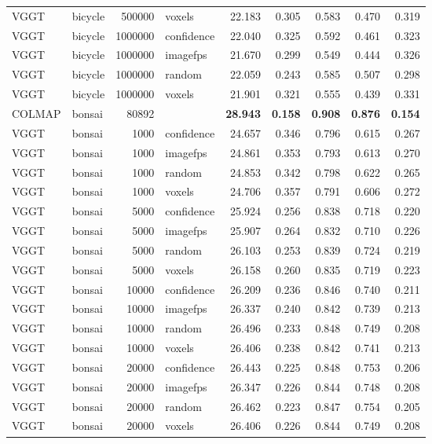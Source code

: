 \begin{table}[H]
\begin{tabular}{llrlrrrrr}
VGGT & bicycle & 500000 & voxels & 22.183 & 0.305 & 0.583 & 0.470 & 0.319 \\
VGGT & bicycle & 1000000 & confidence & 22.040 & 0.325 & 0.592 & 0.461 & 0.323 \\
VGGT & bicycle & 1000000 & imagefps & 21.670 & 0.299 & 0.549 & 0.444 & 0.326 \\
VGGT & bicycle & 1000000 & random & 22.059 & 0.243 & 0.585 & 0.507 & 0.298 \\
VGGT & bicycle & 1000000 & voxels & 21.901 & 0.321 & 0.555 & 0.439 & 0.331 \\
\midrule
COLMAP & bonsai & 80892 &  & \textbf{28.943} & \textbf{0.158} & \textbf{0.908} & \textbf{0.876} & \textbf{0.154} \\
VGGT & bonsai & 1000 & confidence & 24.657 & 0.346 & 0.796 & 0.615 & 0.267 \\
VGGT & bonsai & 1000 & imagefps & 24.861 & 0.353 & 0.793 & 0.613 & 0.270 \\
VGGT & bonsai & 1000 & random & 24.853 & 0.342 & 0.798 & 0.622 & 0.265 \\
VGGT & bonsai & 1000 & voxels & 24.706 & 0.357 & 0.791 & 0.606 & 0.272 \\
VGGT & bonsai & 5000 & confidence & 25.924 & 0.256 & 0.838 & 0.718 & 0.220 \\
VGGT & bonsai & 5000 & imagefps & 25.907 & 0.264 & 0.832 & 0.710 & 0.226 \\
VGGT & bonsai & 5000 & random & 26.103 & 0.253 & 0.839 & 0.724 & 0.219 \\
VGGT & bonsai & 5000 & voxels & 26.158 & 0.260 & 0.835 & 0.719 & 0.223 \\
VGGT & bonsai & 10000 & confidence & 26.209 & 0.236 & 0.846 & 0.740 & 0.211 \\
VGGT & bonsai & 10000 & imagefps & 26.337 & 0.240 & 0.842 & 0.739 & 0.213 \\
VGGT & bonsai & 10000 & random & 26.496 & 0.233 & 0.848 & 0.749 & 0.208 \\
VGGT & bonsai & 10000 & voxels & 26.406 & 0.238 & 0.842 & 0.741 & 0.213 \\
VGGT & bonsai & 20000 & confidence & 26.443 & 0.225 & 0.848 & 0.753 & 0.206 \\
VGGT & bonsai & 20000 & imagefps & 26.347 & 0.226 & 0.844 & 0.748 & 0.208 \\
VGGT & bonsai & 20000 & random & 26.462 & 0.223 & 0.847 & 0.754 & 0.205 \\
VGGT & bonsai & 20000 & voxels & 26.406 & 0.226 & 0.844 & 0.749 & 0.208 \\

\end{tabular}
\end{table}
